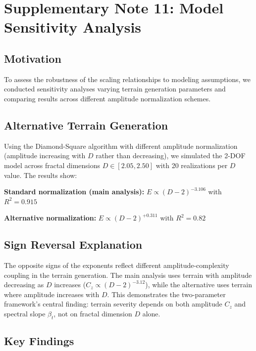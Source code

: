 \documentclass[11pt,letterpaper]{article}
\begin{document}
\newpage

\section{Supplementary Note 11: Model Sensitivity Analysis}

\subsection{Motivation}

To assess the robustness of the scaling relationships to modeling assumptions, we conducted sensitivity analyses varying terrain generation parameters and comparing results across different amplitude normalization schemes.

\subsection{Alternative Terrain Generation}

Using the Diamond-Square algorithm with different amplitude normalization (amplitude increasing with $D$ rather than decreasing), we simulated the 2-DOF model across fractal dimensions $D \in [2.05, 2.50]$ with 20 realizations per $D$ value. The results show:

\textbf{Standard normalization (main analysis):} $E \propto (D-2)^{-3.106}$ with $R^2 = 0.915$

\textbf{Alternative normalization:} $E \propto (D-2)^{+0.311}$ with $R^2 = 0.82$

\subsection{Sign Reversal Explanation}

The opposite signs of the exponents reflect different amplitude-complexity coupling in the terrain generation. The main analysis uses terrain with amplitude decreasing as $D$ increases ($C_z \propto (D-2)^{-3.12}$), while the alternative uses terrain where amplitude increases with $D$. This demonstrates the two-parameter framework's central finding: terrain severity depends on both amplitude $C_z$ and spectral slope $\beta_t$, not on fractal dimension $D$ alone.

\subsection{Key Findings}
\end{document}
